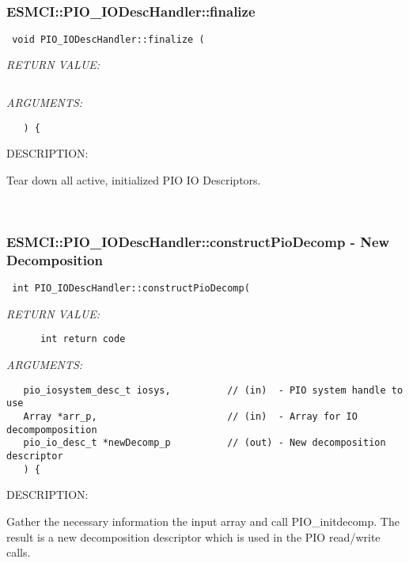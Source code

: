\mbox{}\hrulefill\
 
\subsubsection [ESMCI::PIO\_IODescHandler::finalize] {ESMCI::PIO\_IODescHandler::finalize}


  
\begin{verbatim} void PIO_IODescHandler::finalize (\end{verbatim}{\em RETURN VALUE:}
\begin{verbatim}      \end{verbatim}{\em ARGUMENTS:}
\begin{verbatim}   ) {\end{verbatim}
{\sf DESCRIPTION:\\ }


      Tear down all active, initialized PIO IO Descriptors.
   
 
\mbox{}\hrulefill\
 
\subsubsection [ESMCI::PIO\_IODescHandler::constructPioDecomp] {ESMCI::PIO\_IODescHandler::constructPioDecomp - New Decomposition}


  
\begin{verbatim} int PIO_IODescHandler::constructPioDecomp(\end{verbatim}{\em RETURN VALUE:}
\begin{verbatim}      int return code\end{verbatim}{\em ARGUMENTS:}
\begin{verbatim}   pio_iosystem_desc_t iosys,          // (in)  - PIO system handle to use
   Array *arr_p,                       // (in)  - Array for IO decompomposition
   pio_io_desc_t *newDecomp_p          // (out) - New decomposition descriptor
   ) {\end{verbatim}
{\sf DESCRIPTION:\\ }


      Gather the necessary information the input array and call PIO_initdecomp.
      The result is a new decomposition descriptor which is used in the
       PIO read/write calls.
   
